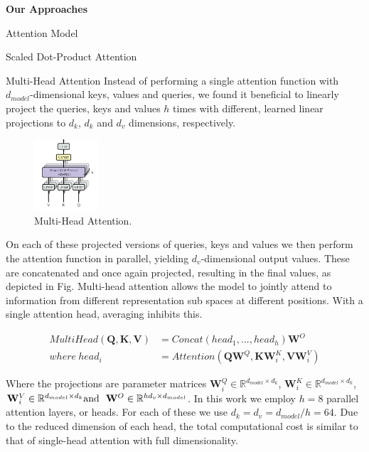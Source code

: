 \documentclass{article}
\def\*#1{\mathbf{#1}}
\begin{document}
\begin{psection}{\textbf{Our Approaches}}
\begin{psubsection}{Attention Model}
\begin{subsubsection}{Scaled Dot-Product Attention}
 \end{subsubsection}

 \begin{subsubsection}{Multi-Head Attention}
     Instead of performing a single attention function with $d_{model}$-dimensional keys, values and queries, we found it beneficial to linearly project the queries, keys and values $h$ times with different, learned linear projections to $d_k$, $d_k$ and $d_v$ dimensions, respectively.

        \begin{figure}[ht!]
			\centering
			\includegraphics[height=100px]{includes/Attention-Multi.png}
			\caption{Multi-Head Attention. }
			\label{fig:attention-dot}
		\end{figure}

     On each of these projected versions of queries, keys and values we then perform the attention function in parallel, yielding $d_v$-dimensional output values. These are concatenated and once again projected, resulting in the final values, as depicted in Fig.
     Multi-head attention allows the model to jointly attend to information from different representation sub spaces at different positions. With a single attention head, averaging inhibits this.

     \begin{align*}
       MultiHead(\*Q, \*K, \*V ) &= Concat(head_1, ..., head_h)\*W^O  \\
      where \ head_i & = Attention(\*Q\*W^Q, \*K\*W_i^K, \*V\*W_i^V)
     \end{align*}

    Where the projections are parameter matrices $\*W_i^Q \in \mathbb{R}^{d_{model}\times d_k}$, $\*W_i^K \in \mathbb{R}^{d_{model}\times d_k}$, $\*W_i^V \in \mathbb{R}^{d_{model}\times d_k} \\ \text{and \ } \*W^O \in \mathbb{R}^{hd_v \times d_{model}}$.
    In this work we employ $h = 8$ parallel attention layers, or heads. For each of these we use $d_k = d_v = d_{model}/h = 64$. Due to the reduced dimension of each head, the total computational cost is similar to that of single-head attention with full dimensionality.


\end{subsubsection}
\end{psubsection}
\end{psection}
\end{document}
